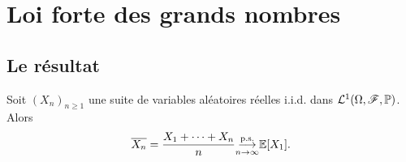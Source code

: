 \section{Loi forte des grands nombres} %

\subsection{Le résultat} %

\begin{theorem}
    Soit \({(X_n)}_{n\geq 1}\) une suite de variables aléatoires
    réelles i.i.d. dans \(\mathcal L^1(\Omega, \mathscr{F}, \mathbb{P})\).
    Alors
    \begin{equation*}
        \overline{X_n} = \frac{X_1 + \cdots + X_n}{n} \underset{n\to\infty}{{\overset{\text{p.s.}}{\longrightarrow}}} \mathbb{E}[X_1].
    \end{equation*}
\end{theorem}